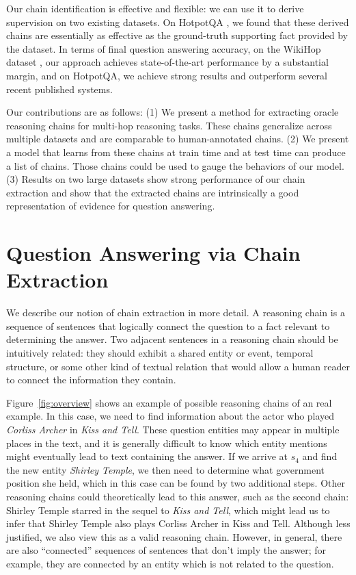 \documentclass[11pt,a4paper]{article}
\begin{document}
Our chain identification is effective and flexible: we can use it to derive supervision on two existing datasets. On HotpotQA \citep{yang2018hotpotqa}, we found that these derived chains are essentially as effective as the ground-truth supporting fact provided by the dataset. In terms of final question answering accuracy, on the WikiHop dataset \citep{welbl2018constructing}, our approach achieves state-of-the-art performance by a substantial margin, and on HotpotQA, we achieve strong results and outperform several recent published systems.

Our contributions are as follows: (1) We present a method for extracting oracle reasoning chains for multi-hop reasoning tasks. These chains generalize across multiple datasets and are comparable to human-annotated chains. (2) We present a model that learns from these chains at train time and at test time can produce a list of chains. Those chains could be used to gauge the behaviors of our model. (3) Results on two large datasets show strong performance of our chain extraction and show that the extracted chains are intrinsically a good representation of evidence for question answering.

\section{Question Answering via Chain Extraction}

We describe our notion of chain extraction in more detail. A reasoning chain is a sequence of sentences that logically connect the question to a fact relevant to determining the answer. Two adjacent sentences in a reasoning chain should be intuitively related: they should exhibit a shared entity or event, temporal structure, or some other kind of textual relation that would allow a human reader to connect the information they contain.

Figure~\ref{fig:overview} shows an example of possible reasoning chains of an real example. In this case, we need to find information about the actor who played \emph{Corliss Archer} in \emph{Kiss and Tell}. These question entities may appear in multiple places in the text, and it is generally difficult to know which entity mentions might eventually lead to text containing the answer. If we arrive at $s_4$ and find the new entity \emph{Shirley Temple}, we then need to determine what government position she held, which in this case can be found by two additional steps. Other reasoning chains could theoretically lead to this answer, such as the second chain: Shirley Temple starred in the sequel to \emph{Kiss and Tell}, which might lead us to infer that Shirley Temple also plays Corliss Archer in Kiss and Tell. Although less justified, we also view this as a valid reasoning chain. However, in general, there are also ``connected'' sequences of sentences that don't imply the answer; for example, they are connected by an entity which is not related to the question.
\end{document}
